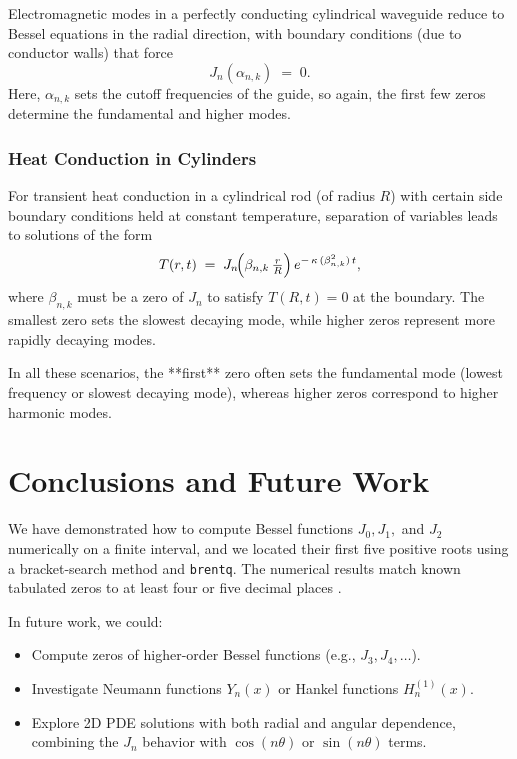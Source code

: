 \documentclass{article}
\begin{document}
Electromagnetic modes in a perfectly conducting cylindrical waveguide reduce 
to Bessel equations in the radial direction, with boundary conditions 
(due to conductor walls) that force
\begin{equation}
J_n(\alpha_{n,k}) \;=\; 0.
\end{equation}
Here, $\alpha_{n,k}$ sets the cutoff frequencies of the guide, so again, 
the first few zeros determine the fundamental and higher modes.

\subsubsection{Heat Conduction in Cylinders}

For transient heat conduction in a cylindrical rod (of radius $R$) with 
certain side boundary conditions held at constant temperature, separation 
of variables leads to solutions of the form
\begin{equation}
T(r,t) \;=\; J_n\!\Bigl(\beta_{n,k}\,\tfrac{r}{R}\Bigr)\,e^{-\,\kappa\,(\beta_{n,k}^2)\,t},
\end{equation}
where $\beta_{n,k}$ must be a zero of $J_n$ to satisfy $T(R,t)=0$ at the 
boundary. The smallest zero sets the slowest decaying mode, while higher 
zeros represent more rapidly decaying modes.

In all these scenarios, the **first** zero often sets the fundamental mode 
(lowest frequency or slowest decaying mode), whereas higher zeros correspond 
to higher harmonic modes.

\section{Conclusions and Future Work} \label{sec:conclusion}

We have demonstrated how to compute Bessel functions $J_0, J_1,$ and $J_2$ 
numerically on a finite interval, and we located their first five positive 
roots using a bracket-search method and \texttt{brentq}. The numerical 
results match known tabulated zeros to at least four or five decimal places 
\citep{Boas2006,Arfken2013,Olver2010}.

In future work, we could:
\begin{itemize}
\item Compute zeros of higher-order Bessel functions (e.g., $J_3, J_4, \dots$).
\item Investigate Neumann functions $Y_n(x)$ or Hankel functions $H^{(1)}_n(x)$.
\item Explore 2D PDE solutions with both radial and angular dependence, 
      combining the $J_n$ behavior with $\cos(n\theta)$ or $\sin(n\theta)$ terms.
\end{itemize}
\end{document}
